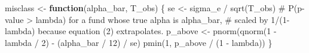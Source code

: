 \documentclass[
  letterpaper,
  DIV=11,
  numbers=noendperiod]{scrartcl}
\newenvironment{Shaded}{\begin{snugshade}}{\end{snugshade}}
\newcommand{\CommentTok}[1]{\textcolor[rgb]{0.37,0.37,0.37}{#1}}
\newcommand{\ControlFlowTok}[1]{\textcolor[rgb]{0.00,0.23,0.31}{\textbf{#1}}}
\newcommand{\DecValTok}[1]{\textcolor[rgb]{0.68,0.00,0.00}{#1}}
\newcommand{\FunctionTok}[1]{\textcolor[rgb]{0.28,0.35,0.67}{#1}}
\newcommand{\NormalTok}[1]{\textcolor[rgb]{0.00,0.23,0.31}{#1}}
\newcommand{\OtherTok}[1]{\textcolor[rgb]{0.00,0.23,0.31}{#1}}
\newcommand{\SpecialCharTok}[1]{\textcolor[rgb]{0.37,0.37,0.37}{#1}}
\begin{document}
\begin{Shaded}
\begin{Highlighting}[]
\NormalTok{misclass }\OtherTok{\textless{}{-}} \ControlFlowTok{function}\NormalTok{(alpha\_bar, T\_obs) \{}
\NormalTok{  se }\OtherTok{\textless{}{-}}\NormalTok{ sigma\_e }\SpecialCharTok{/} \FunctionTok{sqrt}\NormalTok{(T\_obs)}
  \CommentTok{\# P(p{-}value \textgreater{} lambda) for a fund whose true alpha is alpha\_bar,}
  \CommentTok{\# scaled by 1/(1{-}lambda) because equation (2) extrapolates.}
\NormalTok{  p\_above }\OtherTok{\textless{}{-}} \FunctionTok{pnorm}\NormalTok{(}\FunctionTok{qnorm}\NormalTok{(}\DecValTok{1} \SpecialCharTok{{-}}\NormalTok{ lambda }\SpecialCharTok{/} \DecValTok{2}\NormalTok{) }\SpecialCharTok{{-}}\NormalTok{ (alpha\_bar }\SpecialCharTok{/} \DecValTok{12}\NormalTok{) }\SpecialCharTok{/}\NormalTok{ se)}
  \FunctionTok{pmin}\NormalTok{(}\DecValTok{1}\NormalTok{, p\_above }\SpecialCharTok{/}\NormalTok{ (}\DecValTok{1} \SpecialCharTok{{-}}\NormalTok{ lambda))}
\NormalTok{\}}


\end{Highlighting}
\end{Shaded}
\end{document}
